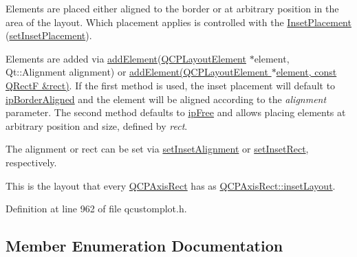 Elements are placed either aligned to the border or at arbitrary position in the area of the layout. Which placement applies is controlled with the \hyperlink{class_q_c_p_layout_inset_a8b9e17d9a2768293d2a7d72f5e298192}{Inset\+Placement} (\hyperlink{class_q_c_p_layout_inset_a63298830744d5d8c5345511c00fd2144}{set\+Inset\+Placement}).

Elements are added via \hyperlink{class_q_c_p_layout_inset_ad61529eb576af7f04dff94abb10c745a}{add\+Element}(\hyperlink{class_q_c_p_layout_element}{Q\+C\+P\+Layout\+Element} $\ast$element, Qt\+::\+Alignment alignment) or \hyperlink{class_q_c_p_layout_inset_a8ff61fbee4a1f0ff45c398009d9f1e56}{add\+Element(\+Q\+C\+P\+Layout\+Element $\ast$element, const Q\+Rect\+F \&rect)}. If the first method is used, the inset placement will default to \hyperlink{class_q_c_p_layout_inset_a8b9e17d9a2768293d2a7d72f5e298192aa81e7df4a785ddee2229a8f47c46e817}{ip\+Border\+Aligned} and the element will be aligned according to the {\itshape alignment} parameter. The second method defaults to \hyperlink{class_q_c_p_layout_inset_a8b9e17d9a2768293d2a7d72f5e298192aa4802986ea2cea457f932b115acba59e}{ip\+Free} and allows placing elements at arbitrary position and size, defined by {\itshape rect}.

The alignment or rect can be set via \hyperlink{class_q_c_p_layout_inset_a62882a4f9ad58bb0f53da12fde022abe}{set\+Inset\+Alignment} or \hyperlink{class_q_c_p_layout_inset_aa487c8378a6f9533567a2e6430099dc3}{set\+Inset\+Rect}, respectively.

This is the layout that every \hyperlink{class_q_c_p_axis_rect}{Q\+C\+P\+Axis\+Rect} has as \hyperlink{class_q_c_p_axis_rect_a4114887c7141b59650b7488f930993e5}{Q\+C\+P\+Axis\+Rect\+::inset\+Layout}. 

Definition at line 962 of file qcustomplot.\+h.



\subsection{Member Enumeration Documentation}
\hypertarget{class_q_c_p_layout_inset_a8b9e17d9a2768293d2a7d72f5e298192}{}
